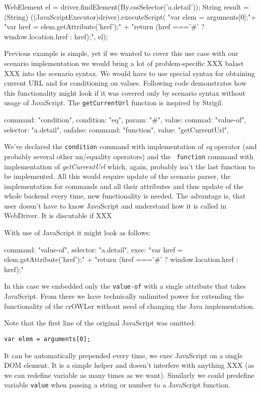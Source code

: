 \begtt
WebElement el = driver.findElement(By.cssSelector('a.detail'));
String result = (String) ((JavaScriptExecutor)driver).executeScript(
"var elem = arguments[0];"+
"var href = elem.getAttribute('href');" +
"return (href ==='#' ? window.location.href : href);", el);
\endtt

Previous example is simple, yet if we wanted to cover this use case with our
scenario implementation we would bring a lot of problem-specific XXX balast XXX
into the scenario syntax. We would have to use special syntax for obtaining
current URL and for conditioning on values. Following code demonstrates how this 
functionality might look if it was covered only by scenario syntax without usage
of JavaScript. The {\tt getCurrentUrl} function is inspired by Strigil. 

\begtt
{
  command: "condition", 
  condition: "eq", 
  param: "#", 
  value: {
    commad: "value-of", 
    selector: "a.detail", 
  }
  onfalse: {
    command: "function", 
    value: "getCurrentUrl", 
  }
}
\endtt

We've declared the {\tt condition} command with implementation of {\em eq}
operator (and probably several other un/equality operators) and the {\tt
function} command with implementation of {\em getCurrentUrl} which, again,
probably isn't the last function to be implemented. All this would require
update of the scenario parser, the implementation for commands and all their
attributes and thus update of the whole backend every time, new functionality is
needed. The advantage is, that user doesn't have to know JavaScript and
understand how it is called in WebDriver. It is discutable if XXX

With use of JavaScript it might look as follows: 

\begtt
{
  command: "value-of", 
  selector: "a.detail", 
  exec: "var href = elem.getAttribute('href');" +
        "return (href ==='#' ? window.location.href : href);"
}
\endtt

In this case we embedded only the {\tt value-of} with a single attribute that
takes JavaScript. From there we have technically unlimited power for extending
the functionality of the crOWLer without need of changing the Java
implementation. 

Note that the first line of the original JavaScript was omitted: 

{\tt var elem = arguments[0];} 

It can be automatically prepended every time, we exec JavaScript on a single
DOM element. It is a simple helper and doesn't interfere with anything XXX (as
we can redefine variable as many times as we want). Similarly we could
predefine variable {\tt value} when passing a string or number to a JavaScript
function. 

